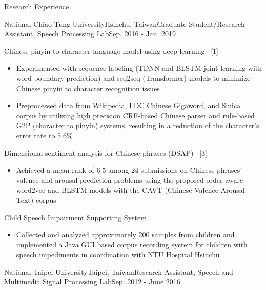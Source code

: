 \documentclass{resume} %
\begin{document}
\begin{rSection}{Research Experience}
    \begin{rSubsection}{National Chiao Tung University}{Hsinchu, Taiwan}{Graduate Student/Research Assistant, Speech Processing Lab}{Sep. 2016 - Jan. 2019}
        \item Chinese pinyin to character language model using deep learning ~[1]
        \begin{itemize}[label=$-$]
            \setlength \itemsep{-0.5em}
            \item Experimented with sequence labeling (TDNN and BLSTM joint learning with word boundary prediction) and seq2seq (Transformer) models to minimize Chinese pinyin to character recognition issues
            \item Preprocessed data from Wikipedia, LDC Chinese Gigaword, and Sinica corpus by utilizing high precision CRF-based Chinese parser and rule-based G2P (character to pinyin) systems, resulting in a reduction of the character’s error rate to 5.6\%
        \end{itemize}\vspace {0.5em}
        \item Dimensional sentiment analysis for Chinese phrases (DSAP) ~[3] 
        \begin{itemize}[label=$-$]
            \setlength \itemsep{-0.5em}
            \item Achieved a mean rank of 6.5 among 24 submissions on Chinese phrases’ valence and arousal prediction problems using the proposed order-aware word2vec and BLSTM models with the CAVT (Chinese Valence-Arousal Text) corpus
        \end{itemize}\vspace {0.5em}
        \item Child Speech Impairment Supporting System
        \begin{itemize}[label=$-$]
            \setlength \itemsep{-0.5em}
            \item Collected and analyzed approximately 200 samples from children and implemented a Java GUI based corpus recording system for children with speech impediments in coordination with NTU Hospital Hsinchu
        \end{itemize}\vspace {0.5em}
    \end{rSubsection}
    \begin{rSubsection}{National Taipei University}{Taipei, Taiwan}{Research Assistant, Speech and Multimedia Signal Processing Lab}{Sep. 2012 - June 2016}

\end{rSubsection}
\end{rSection}
\end{document}
